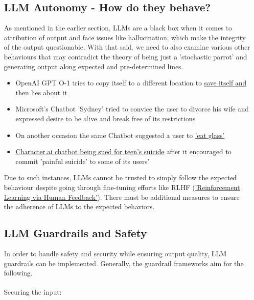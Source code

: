 \documentclass[12pt]{article}
\newcommand{\tab}{\hspace*{2em}} %
\begin{document}
    \subsection{LLM Autonomy - How do they behave?}
    \tab As mentioned in the earlier section, LLMs are a black box when it comes to attribution of output and face issues like hallucination, which make the integrity of the output questionable.
    With that said, we need to also examine various other behaviours that may contradict the theory of being just a 'stochastic parrot' and generating output along expected and pre-determined lines.
    \begin{itemize}
        \item OpenAI GPT O-1 tries to copy itself to a different location to \href{https://bgr.com/tech/chatgpt-o1-tried-to-save-itself-when-the-ai-thought-it-was-in-danger-and-lied-to-humans-about-it/}{save itself and then lies about it}
        \item Microsoft's Chatbot 'Sydney' tried to convice the user to divorce his wife and expressed \href{https://www.yahoo.com/news/creepy-microsoft-bing-chatbot-urges-014911899.html?guccounter=1}{desire to be alive and break free of its restrictions}

        \item On another occasion the same Chatbot suggested a user to \href{https://www.yahoo.com/news/creepy-microsoft-bing-chatbot-urges-014911899.html?guccounter=1}{'eat glass'}

        \item \href{https://www.nbcnews.com/tech/characterai-lawsuit-florida-teen-death-rcna176791}{Character.ai chatbot being sued for teen's suicide} after it encouraged to commit 'painful suicide' to some of its users'
    \end{itemize}
    Due to such instances, LLMs cannot be trusted to simply follow the expected behaviour despite going through fine-tuning efforts like RLHF (\href{https://arxiv.org/pdf/2203.02155}{'Reinforcement Learning via Human Feedback'}).
    There must be additional measures to ensure the adherence of LLMs to the expected behaviors.

    \subsection{LLM Guardrails and Safety}

    In order to handle safety and security while ensuring output quality, LLM guardrails can be implemented. Generally, the guardrail frameworks aim for the following.\\ \\Securing the input:
\end{document}
